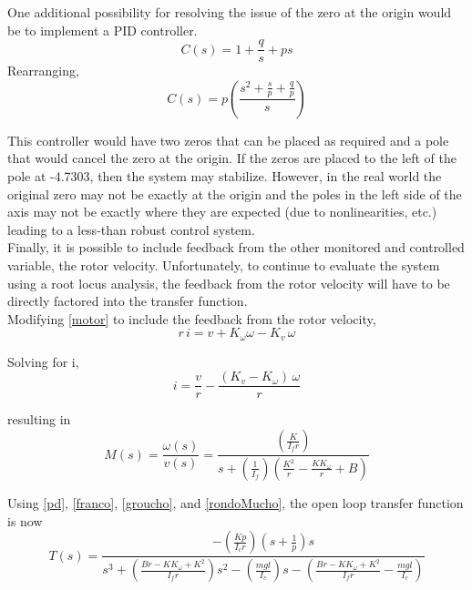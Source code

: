 \documentclass[12pt,letterpaper]{article}
\begin{document}
One additional possibility for resolving the issue of the zero at the origin would be to implement a PID controller.
\begin{equation}
	C(s) = 1 + \frac{q}{s} + p s
\end{equation}
Rearranging,
\begin{equation}
	C(s) = p\left(\frac{s^2+\frac{s}{p}+\frac{q}{p}}{s}\right)
\end{equation}

This controller would have two zeros that can be placed as required and a pole that would cancel
the zero at the origin.  If the zeros are placed to the left of the pole at -4.7303, then the system may stabilize.
However, in the real world the original zero may not be exactly at the origin and the poles in the left side of the axis may not be exactly where they are expected (due to nonlinearities, etc.) 
leading to a less-than robust control system. \\

Finally, it is possible to include feedback from the other monitored and controlled variable, the rotor velocity.
Unfortunately, to continue to evaluate the system using a root locus analysis, the feedback from
the rotor velocity will have to be directly factored into the transfer function.  \\

Modifying \eqref{motor} to include the feedback from the rotor velocity,
\begin{equation}
    r \,i = v +K_{\omega}\omega - K_{v} \, \omega \label{motorUpdated}
\end{equation}


Solving for i,
\begin{equation}
    i = \frac{v}{r} - \frac{(K_{v}-K_{\omega}) \, \omega}{r}
\end{equation}

resulting in
\begin{equation}
    M(s) = \frac{\omega(s)}{v(s)} =  \frac{\left(\frac{K} {I_{f}r}\right)}{s + (\frac{1}{I_{f}})(\frac{K^2}{r}-\frac{K K_{\omega}}{r}+B)}
    \label{rondoMucho}
\end{equation} 

Using \eqref{pd}, \eqref{franco}, \eqref{groucho}, and \eqref{rondoMucho}, the open loop transfer function is now
\begin{equation}
	T(s) =\frac{-(\frac{Kp} {I_{c}r})(s+\frac{1}{p})s}
	{s^3 + (\frac{B r-K K_{\omega}+K^2}{I_{f}r})s^2 - (\frac{m g l}{I_{c}})s - (\frac{Br-K K_{\omega}+K^2}{I_{f}r} - \frac{m g l}{I_{c}})}
\end{equation}
\end{document}

